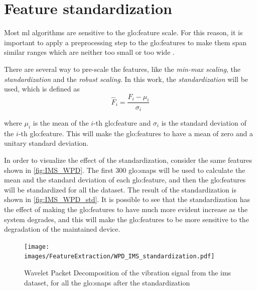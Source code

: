 \section{Feature standardization}
Most \gls{ml} algorithms are sensitive to the \gls{glo:feature} scale. For this reason, it is important to apply a preprocessing step to the \gls{glo:feature}s to make them span similar ranges which are neither too small or too wide .

There are several way to pre-scale the features, like the \emph{min-max scaling}, the \emph{standardization} and the \emph{robust scaling}. In this work, the \emph{standardization} will be used, which is defined as
\begin{equation}
    \hat{F}_i = \frac{F_i - \mu_i}{\sigma_i}
\end{equation}

where $\mu_i$ is the mean of the $i$-th \gls{glo:feature} and $\sigma_i$ is the standard deviation of the $i$-th \gls{glo:feature}. This will make the \gls{glo:feature}s to have a mean of zero and a unitary standard deviation.

In order to visualize the effect of the standardization, consider the same features shown in \autoref{fig:IMS_WPD}. 
The first 300 \gls{glo:snap}s will be used to calculate the mean and the standard deviation of each \gls{glo:feature}, and then the \gls{glo:feature}s will be standardized for all the dataset.
The result of the standardization is shown in \autoref{fig:IMS_WPD_std}. It is possible to see that the standardization has the effect of making the \gls{glo:feature}s to have much more evident increase as the system degrades, and this will make the \gls{glo:feature}s to be more sensitive to the degradation of the maintained device.

\begin{figure}
    \centering
    \texttt{[image: images/FeatureExtraction/WPD\_IMS\_standardization.pdf]}
    \caption{Wavelet Packet Decomposition of the  vibration signal from the \gls{ims} dataset, for all the \gls{glo:snap}s after the standardization} 
    \label{fig:IMS_WPD_std}
\end{figure}


